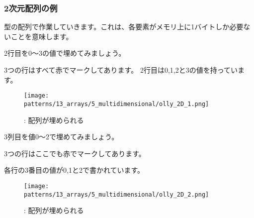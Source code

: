 ﻿\subsubsection{2次元配列の例}

\Tchar 型の配列で作業していきます。これは、各要素がメモリ上に1バイトしか必要ないことを意味します。

\myindex{\olly}

2行目を0～3の値で埋めてみましょう。



3つの行はすべて赤でマークしてあります。
2行目は0,1,2と3の値を持っています。

\begin{figure}[H]
\centering
\texttt{[image: patterns/13\_arrays/5\_multidimensional/olly\_2D\_1.png]}
\caption{\olly: 配列が埋められる}
\end{figure}

\myindex{\olly}

3列目を値0～2で埋めてみましょう。



3つの行はここでも赤でマークしてあります。

各行の3番目の値が0,1と2で書かれています。

\begin{figure}[H]
\centering
\texttt{[image: patterns/13\_arrays/5\_multidimensional/olly\_2D\_2.png]}
\caption{\olly: 配列が埋められる}
\end{figure}

